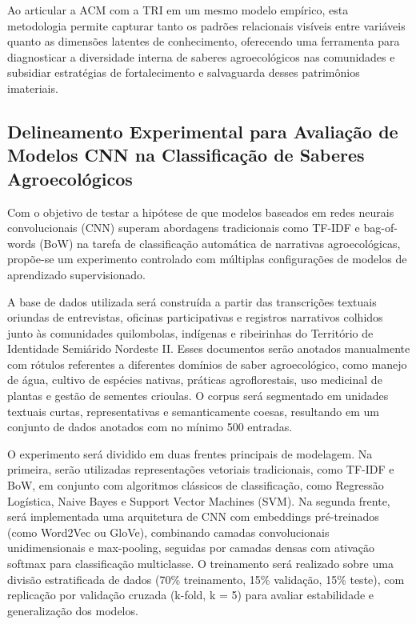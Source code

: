 Ao articular a ACM com a TRI em um mesmo modelo empírico, esta metodologia permite capturar tanto os padrões relacionais visíveis entre variáveis quanto as dimensões latentes de conhecimento, oferecendo uma ferramenta para diagnosticar a diversidade interna de saberes agroecológicos nas comunidades e subsidiar estratégias de fortalecimento e salvaguarda desses patrimônios imateriais.



\subsection{Delineamento Experimental para Avaliação de Modelos CNN na Classificação de Saberes Agroecológicos}

Com o objetivo de testar a hipótese de que modelos baseados em redes neurais convolucionais (CNN) superam abordagens tradicionais como TF-IDF e bag-of-words (BoW) na tarefa de classificação automática de narrativas agroecológicas, propõe-se um experimento controlado com múltiplas configurações de modelos de aprendizado supervisionado.

A base de dados utilizada será construída a partir das transcrições textuais oriundas de entrevistas, oficinas participativas e registros narrativos colhidos junto às comunidades quilombolas, indígenas e ribeirinhas do Território de Identidade Semiárido Nordeste II. Esses documentos serão anotados manualmente com rótulos referentes a diferentes domínios de saber agroecológico, como manejo de água, cultivo de espécies nativas, práticas agroflorestais, uso medicinal de plantas e gestão de sementes crioulas. O corpus será segmentado em unidades textuais curtas, representativas e semanticamente coesas, resultando em um conjunto de dados anotados com no mínimo 500 entradas.

O experimento será dividido em duas frentes principais de modelagem. Na primeira, serão utilizadas representações vetoriais tradicionais, como TF-IDF e BoW, em conjunto com algoritmos clássicos de classificação, como Regressão Logística, Naive Bayes e Support Vector Machines (SVM). Na segunda frente, será implementada uma arquitetura de CNN com embeddings pré-treinados (como Word2Vec ou GloVe), combinando camadas convolucionais unidimensionais e max-pooling, seguidas por camadas densas com ativação softmax para classificação multiclasse. O treinamento será realizado sobre uma divisão estratificada de dados (70\% treinamento, 15\% validação, 15\% teste), com replicação por validação cruzada (k-fold, k = 5) para avaliar estabilidade e generalização dos modelos.

